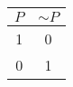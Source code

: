 \begin{tabular}{|c||c|}
\hline
$ P $ & $  \sim P $ \\
\hline
1 & 0 \\
0 & 1 \\
\hline
\end{tabular}
